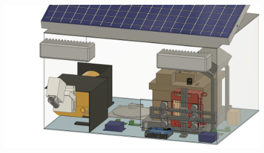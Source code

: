 \begin{figure}[h]
    \centering
    \includegraphics[width=\textwidth]{images/whole_box.png}
    \label{fig:whole_thing}
\end{figure}
